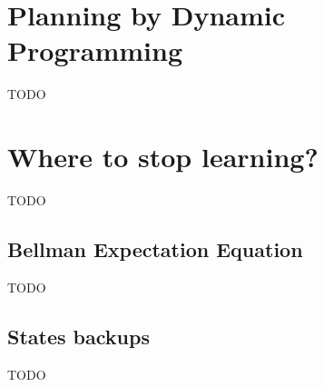 \section{Planning by Dynamic Programming}\label{sec:planning-by-dynamic-programming}
TODO
%
%
%
\section{Where to stop learning?}\label{sec:where-to-stop-learning}
TODO

\subsection{Bellman Expectation Equation}\label{sec:bellman-expectation-equation} %
TODO

\subsection{States backups}
TODO

